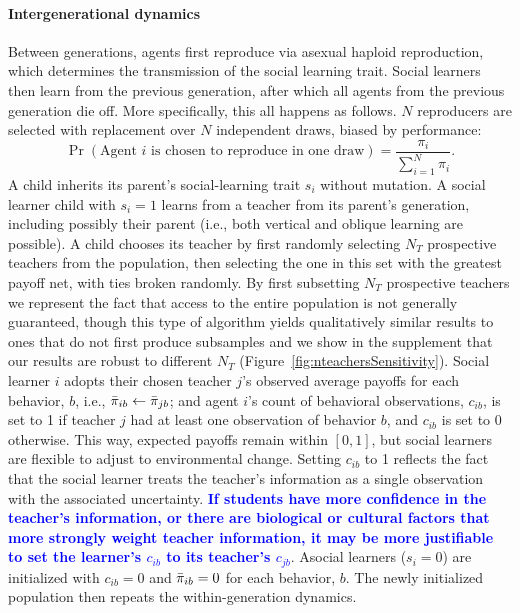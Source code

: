 \documentclass[letterpaper,11.5pt]{scrartcl}
\newcommand{\edit}[1]{{\bfseries \textcolor{blue} {#1}}}
\begin{document}
\paragraph{Intergenerational dynamics} Between generations, agents first reproduce
via asexual haploid reproduction, which determines the transmission of the social
learning trait. Social learners then learn from the previous generation, after which
all agents from the previous generation die off. %
More
specifically, this all happens as follows.  $N$ reproducers are selected with
replacement over $N$ independent draws, biased by performance: 
\begin{equation}
  \Pr(\text{Agent $i$ is chosen to reproduce in one draw}) =
\frac{\pi_i}{\sum_{i=1}^N \pi_i}.  
\end{equation} 
\noindent 
A child inherits its parent's social-learning trait $s_i$ without mutation.  A social learner child with $s_i = 1$ learns from a teacher from its parent's generation, including possibly their parent (i.e., both vertical and oblique learning are possible).  A child chooses its teacher by first randomly selecting $N_T$ prospective teachers from the population, then selecting the one in this set with the greatest payoff net, with ties broken randomly. By first subsetting $N_T$ prospective teachers we represent the fact that access to the entire population is not generally guaranteed, though this type of algorithm yields qualitatively similar results to ones that do not first produce subsamples \citep{smaldino2019open} and we show in the supplement that our results are robust to different $N_T$
(Figure~\ref{fig:nteachersSensitivity}). Social learner $i$ adopts their chosen 
teacher $j$'s observed average payoffs for each behavior, $b$, i.e., 
$\bar\pi_{ib} \leftarrow \bar\pi_{jb}$; 
and agent $i$'s count of behavioral observations, $c_{ib}$, is set to 1 if teacher $j$ had at least
one observation of behavior $b$, and $c_{ib}$ is set to 0 otherwise. This way, expected payoffs
remain within $[0, 1]$, but social learners are flexible to adjust to environmental change. Setting
$c_{ib}$ to 1 reflects the fact that the social learner treats the teacher's information as a single
observation with the associated uncertainty. \edit{If students have more confidence
in the teacher's information, or there are biological or cultural factors that more
strongly weight teacher information, it may be more justifiable to set the learner's $c_{ib}$ to its teacher's $c_{jb}$}. Asocial learners ($s_i = 0$) are initialized with
$c_{ib} = 0$ and $\bar\pi_{ib} = 0$ for each behavior, $b$. %
The newly initialized population then repeats the within-generation dynamics. 
\end{document}
